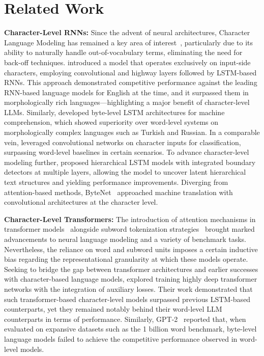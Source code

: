 \section{Related Work}
\label{section:related_work}

\textbf{Character-Level RNNs:} Since the advent of neural architectures, Character Language Modeling has remained a key area of interest~\citep{sutskever2011generating,mikolov2012subword,graves2013generating}, particularly due to its ability to naturally handle out-of-vocabulary terms, eliminating the need for back-off techniques. \cite{kim2016character} introduced a model that operates exclusively on input-side characters, employing convolutional and highway layers followed by LSTM-based RNNs. This approach demonstrated competitive performance against the leading RNN-based language models for English at the time, and it surpassed them in morphologically rich languages—highlighting a major benefit of character-level LLMs. Similarly, \cite{kenter2018byte} developed byte-level LSTM architectures for machine comprehension, which showed superiority over word-level systems on morphologically complex languages such as Turkish and Russian. In a comparable vein, \cite{zhang2015character} leveraged convolutional networks on character inputs for classification, surpassing word-level baselines in certain scenarios. To advance character-level modeling further, \citet{chung2019hierarchical} proposed hierarchical LSTM models with integrated boundary detectors at multiple layers, allowing the model to uncover latent hierarchical text structures and yielding performance improvements. Diverging from attention-based methods, ByteNet~\cite{kalchbrenner2016neural} approached machine translation with convolutional architectures at the character level.

\textbf{Character-Level Transformers:} The introduction of attention mechanisms in transformer models~\citep{vaswani2017attention} alongside subword tokenization strategies~\citep{sennrich-etal-2016-neural} brought marked advancements to neural language modeling and a variety of benchmark tasks. Nevertheless, the reliance on word and subword units imposes a certain inductive bias regarding the representational granularity at which these models operate. Seeking to bridge the gap between transformer architectures and earlier successes with character-based language models, \citet{al2019character} explored training highly deep transformer networks with the integration of auxiliary losses. Their work demonstrated that such transformer-based character-level models surpassed previous LSTM-based counterparts, yet they remained notably behind their word-level LLM counterparts in terms of performance. Similarly, GPT-2~\citep{radfordgpt2} reported that, when evaluated on expansive datasets such as the 1 billion word benchmark, byte-level language models failed to achieve the competitive performance observed in word-level models.

